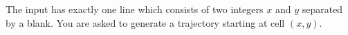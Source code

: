 The input has exactly one line which consists of two integers $x$ and $y$ 
separated by a blank. You are asked to generate a trajectory starting at
cell $(x,y)$.
